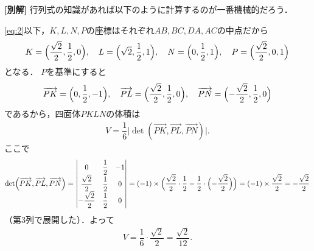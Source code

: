 \documentclass[../../main.tex]{subfiles}
\begin{document}

{\bf [別解]}
行列式の知識があれば以下のように計算するのが一番機械的だろう．

\cref{eq:2}以下，$K,L,N,P$の座標はそれぞれ$AB,BC,DA,AC$の中点だから
\begin{align}
  K=\Bigl(\dfrac{\sqrt{2}}{2},\dfrac{1}{2},0\Bigr),\quad L=\Bigl(\sqrt{2},\dfrac{1}{2},1\Bigr),\quad N=\Bigl(0,\dfrac{1}{2},1\Bigr),\quad P=\Bigl(\dfrac{\sqrt{2}}{2},0,1\Bigr) \label{eq:3}
\end{align}
となる．
$P$を基準にすると
\begin{align}
  \overrightarrow{PK}=\Bigl(0,\dfrac{1}{2},-1\Bigr),\quad \overrightarrow{PL}=\Bigl(\dfrac{\sqrt{2}}{2},\dfrac{1}{2},0\Bigr),\quad\overrightarrow{PN}=\Bigl(-\dfrac{\sqrt{2}}{2},\dfrac{1}{2},0\Bigr)
\end{align}
であるから，四面体$PKLN$の体積は
\begin{align}
  V=\dfrac{1}{6}\bigl|\det(\overrightarrow{PK},\overrightarrow{PL},\overrightarrow{PN})\bigr|.
\end{align}
ここで
\begin{align}
  \det(\overrightarrow{PK},\overrightarrow{PL},\overrightarrow{PN})
  =
  \begin{vmatrix}0&\dfrac{1}{2}&-1\\[2pt]\dfrac{\sqrt{2}}{2}&\dfrac{1}{2}&0\\[2pt]-\dfrac{\sqrt{2}}{2}&\dfrac{1}{2}&0
  \end{vmatrix}
  =(-1)\times\Bigl(\dfrac{\sqrt{2}}{2}\cdot\dfrac{1}{2}-\dfrac{1}{2}\cdot\Bigl(-\dfrac{\sqrt{2}}{2}\Bigr)\Bigr)=(-1)\times\dfrac{\sqrt{2}}{2}=-\dfrac{\sqrt{2}}{2}
\end{align}
（第3列で展開した）．よって
\begin{align}
  V=\dfrac{1}{6}\cdot\dfrac{\sqrt{2}}{2}=\dfrac{\sqrt{2}}{12}.
\end{align}
\end{document}
